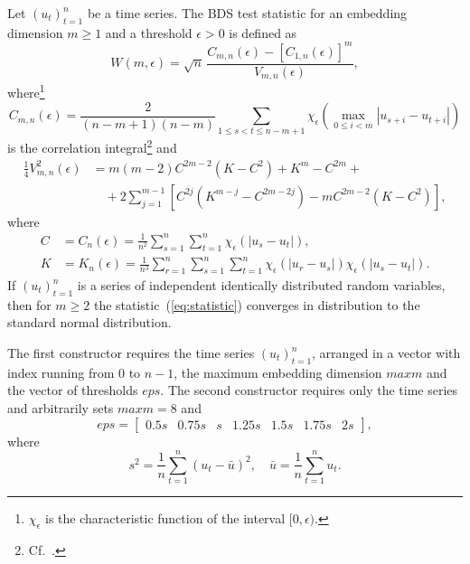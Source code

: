 Let $(u_t)_{t = 1}^n$ be a time series. The BDS test statistic for an
embedding dimension $m \geq 1$ and a threshold $\epsilon > 0$ is
defined as
\begin{equation} \label{eq:statistic}
  W(m, \epsilon) = \sqrt{n} \, \frac{C_{m, n}(\epsilon) - [C_{1,
        n}(\epsilon)]^m} {V_{m, n}(\epsilon)},
\end{equation}
where\footnote{$\chi_{\epsilon}$ is the characteristic function of the
  interval $[0, \epsilon)$.}
\begin{equation} \label{eq:Cmn}
  C_{m, n}(\epsilon) = \frac{2}{(n - m + 1)(n - m)} \sum_{1 \leq s < t
    \leq n - m + 1} \chi_{\epsilon} \left( \max_{0 \leq i < m} |u_{s +
    i} - u_{t + i}| \right)
\end{equation}
is the correlation integral\footnote{Cf.~\cite [p.~120]
  {baker-gollub-1998}.} and
\begin{equation} \label{eq:bds2.11}
  \begin{split}
  \frac{1}{4}V_{m, n}^2(\epsilon) &= m(m - 2) C^{2m - 2} (K - C^2) +
  K^m - C^{2m} + \\
  & \quad + 2 \sum_{j = 1}^{m - 1} \left[ C^{2j} (K^{m - j} - C^{2m -
      2j}) - mC^{2m -2} (K - C^2) \right],
  \end{split}
\end{equation}
where
\begin{align} \label{eq:bds2.12}
  C &= C_n(\epsilon) = \frac{1}{n^2} \sum_{s = 1}^n \sum_{t = 1}^n
  \chi_{\epsilon}(|u_s - u_t|), \\
  \label{eq:bds2.13}
  K &= K_n(\epsilon) = \frac{1}{n^3} \sum_{r = 1}^n \sum_{s = 1}^n
  \sum_{t = 1}^n \chi_{\epsilon}(|u_r - u_s|) \chi_{\epsilon}(|u_s -
  u_t|).
\end{align}
If $(u_t)_{t = 1}^n$ is a series of independent identically
distributed random variables, then for $m \geq 2$ the
statistic~(\ref{eq:statistic}) converges in distribution to the
standard normal distribution.

The first constructor requires the time series $(u_t)_{t = 1}^{n}$,
arranged in a vector with index running from 0 to $n - 1$, the maximum
embedding dimension $\mathit{maxm}$ and the vector of thresholds
$\mathit{eps}$. The second constructor requires only the time series
and arbitrarily sets $\mathit{maxm} = 8$ and \[ \mathit{eps}
= \begin{bmatrix} 0.5s & 0.75s & s & 1.25s & 1.5s & 1.75s &
  2s \end{bmatrix}, \] where
\begin{equation} \label{eq:mean_var}
  s^2 = \frac{1}{n} \sum_{t = 1}^n (u_t - \bar{u})^2, \quad
  \bar{u} = \frac{1}{n} \sum_{t = 1}^n u_t.
\end{equation}


